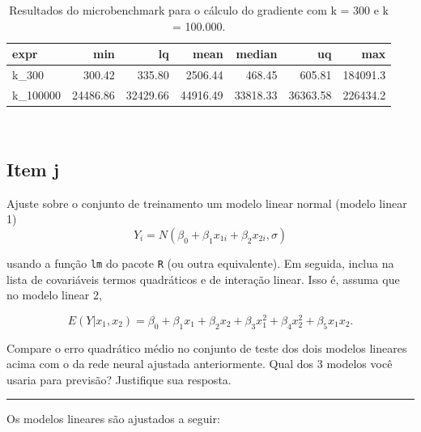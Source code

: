 \documentclass[
  a4paperpaper,
]{article}
\begin{document}
\begin{longtable}[]{@{}lrrrrrr@{}}

\caption{\label{tbl-microbenchmark}Resultados do microbenchmark para o
cálculo do gradiente com k = 300 e k = 100.000.}

\tabularnewline

\toprule\noalign{}
expr & min & lq & mean & median & uq & max \\
\midrule\noalign{}
\endhead
\bottomrule\noalign{}
\endlastfoot
k\_300 & 300.42 & 335.80 & 2506.44 & 468.45 & 605.81 & 184091.3 \\
k\_100000 & 24486.86 & 32429.66 & 44916.49 & 33818.33 & 36363.58 &
226434.2 \\

\end{longtable}

~

\subsection{Item j}\label{item-j}

Ajuste sobre o conjunto de treinamento um modelo linear normal (modelo
linear 1) \[
Y_i = N \left(\beta_0 + \beta_1 x_{1i} + \beta_2 x_{2i}, \sigma \right)
\]

usando a função \texttt{lm} do pacote \texttt{R} (ou outra equivalente).
Em seguida, inclua na lista de covariáveis termos quadráticos e de
interação linear. Isso é, assuma que no modelo linear 2,

\[
E(Y|x_1, x_2) = \beta_0 + \beta_1 x_{1} + \beta_2 x_{2} + \beta_3 x_1^2 + \beta_4 x_2^2 + \beta_5 x_1 x_2.
\]

Compare o erro quadrático médio no conjunto de teste dos dois modelos
lineares acima com o da rede neural ajustada anteriormente. Qual dos 3
modelos você usaria para previsão? Justifique sua resposta.

\begin{center}\rule{0.5\linewidth}{0.5pt}\end{center}

Os modelos lineares são ajustados a seguir:
\end{document}
